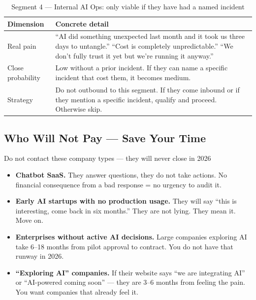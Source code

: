 \begin{table}[H]
\centering\renewcommand{\arraystretch}{1.55}
\begin{tabularx}{\textwidth}{@{}lX@{}}
\toprule
\textbf{Dimension} & \textbf{Concrete detail} \\
\midrule
Real pain & ``AI did something unexpected last month and it took us three
  days to untangle.'' ``Cost is completely unpredictable.'' ``We don't fully
  trust it yet but we're running it anyway.'' \\
Close probability & Low without a prior incident. If they can name a specific
  incident that cost them, it becomes medium. \\
Strategy & Do not outbound to this segment. If they come inbound or if they
  mention a specific incident, qualify and proceed. Otherwise skip. \\
\bottomrule
\end{tabularx}
\caption{Segment 4 --- Internal AI Ops: only viable if they have had a named incident}
\end{table}

\subsection{Who Will Not Pay --- Save Your Time}

\begin{warnbox}{Do not contact these company types --- they will never close in 2026}
\begin{itemize}[noitemsep, leftmargin=1.4em]
  \item \textbf{Chatbot SaaS.} They answer questions, they do not take actions.
    No financial consequence from a bad response = no urgency to audit it.
  \item \textbf{Early AI startups with no production usage.}
    They will say ``this is interesting, come back in six months.''
    They are not lying. They mean it. Move on.
  \item \textbf{Enterprises without active AI decisions.}
    Large companies exploring AI take 6--18 months from pilot approval to
    contract. You do not have that runway in 2026.
  \item \textbf{``Exploring AI'' companies.}
    If their website says ``we are integrating AI'' or ``AI-powered coming
    soon'' --- they are 3--6 months from feeling the pain. You want companies
    that already feel it.
\end{itemize}
\end{warnbox}

